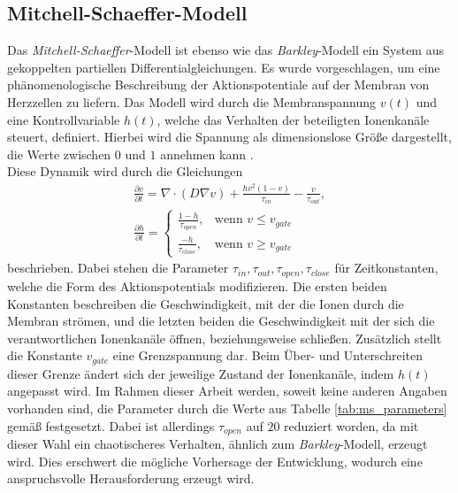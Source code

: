 \subsection{Mitchell-Schaeffer-Modell}
Das \textit{Mitchell-Schaeffer}-Modell ist ebenso wie das \textit{Barkley}-Modell ein System aus gekoppelten partiellen Differentialgleichungen. Es wurde vorgeschlagen, um eine phänomenologische Beschreibung der Aktionspotentiale auf der Membran von Herzzellen zu liefern. Das Modell wird durch die Membranspannung $v(t)$ und eine Kontrollvariable $h(t)$, welche das Verhalten der beteiligten Ionenkanäle steuert, definiert. Hierbei wird die Spannung als dimensionslose Größe dargestellt, die Werte zwischen $0$ und $1$ annehmen kann \citep{mitchell2003two}.\\

Diese Dynamik wird durch die Gleichungen 
\begin{equation}
\begin{gathered}
\frac{\partial v}{\partial t} = \nabla \cdot (D \nabla v) + \frac{h v^2(1-v)}{\tau_{in}} - \frac{v}{\tau_{out}},\\
\frac{\partial h}{\partial t} =
\begin{cases}
	\frac{1-h}{\tau_{open}},& \text{wenn } v \leq v_{gate}\\
    \frac{-h}{\tau_{close}},& \text{wenn } v \geq v_{gate}
\end{cases}
\end{gathered}
\end{equation}
beschrieben. Dabei stehen die Parameter $\tau_{in}, \tau_{out}, \tau_{open}, \tau_{close}$ für Zeitkonstanten, welche die Form des Aktionspotentials modifizieren. Die ersten beiden Konstanten beschreiben die Geschwindigkeit, mit der die Ionen durch die Membran strömen, und die letzten beiden die Geschwindigkeit mit der sich die verantwortlichen Ionenkanäle öffnen, beziehungsweise schließen. Zusätzlich stellt die Konstante $v_{gate}$ eine Grenzspannung dar. Beim Über- und Unterschreiten dieser Grenze ändert sich der jeweilige Zustand der Ionenkanäle, indem $h(t)$ angepasst wird. Im Rahmen dieser Arbeit werden, soweit keine anderen Angaben vorhanden sind, die Parameter durch die Werte aus Tabelle \ref{tab:ms_parameters} gemäß \citep{mitchell2003two} festgesetzt. Dabei ist allerdings $\tau_{open}$ auf $20$ \citep[S. 134ff.]{bartocci2016computational} reduziert worden, da mit dieser Wahl ein chaotischeres Verhalten, ähnlich zum \textit{Barkley}-Modell, erzeugt wird. Dies erschwert die mögliche Vorhersage der Entwicklung, wodurch eine anspruchsvolle Herausforderung erzeugt wird.\\

